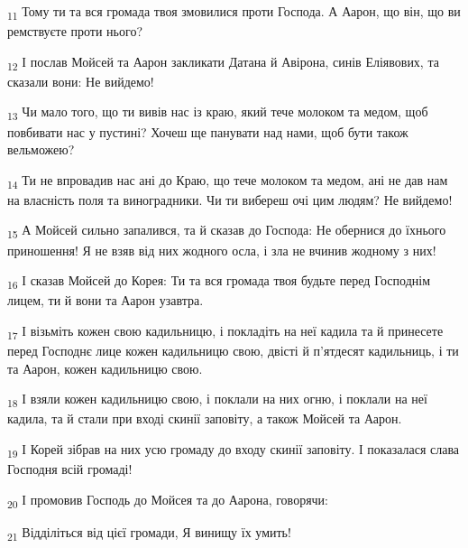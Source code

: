 \begin{tcolorbox}
\textsubscript{11} Тому ти та вся громада твоя змовилися проти Господа. А Аарон, що він, що ви ремствуєте проти нього?
\end{tcolorbox}
\begin{tcolorbox}
\textsubscript{12} І послав Мойсей та Аарон закликати Датана й Авірона, синів Еліявових, та сказали вони: Не вийдемо!
\end{tcolorbox}
\begin{tcolorbox}
\textsubscript{13} Чи мало того, що ти вивів нас із краю, який тече молоком та медом, щоб повбивати нас у пустині? Хочеш ще панувати над нами, щоб бути також вельможею?
\end{tcolorbox}
\begin{tcolorbox}
\textsubscript{14} Ти не впровадив нас ані до Краю, що тече молоком та медом, ані не дав нам на власність поля та виноградники. Чи ти вибереш очі цим людям? Не вийдемо!
\end{tcolorbox}
\begin{tcolorbox}
\textsubscript{15} А Мойсей сильно запалився, та й сказав до Господа: Не обернися до їхнього приношення! Я не взяв від них жодного осла, і зла не вчинив жодному з них!
\end{tcolorbox}
\begin{tcolorbox}
\textsubscript{16} І сказав Мойсей до Корея: Ти та вся громада твоя будьте перед Господнім лицем, ти й вони та Аарон узавтра.
\end{tcolorbox}
\begin{tcolorbox}
\textsubscript{17} І візьміть кожен свою кадильницю, і покладіть на неї кадила та й принесете перед Господнє лице кожен кадильницю свою, двісті й п'ятдесят кадильниць, і ти та Аарон, кожен кадильницю свою.
\end{tcolorbox}
\begin{tcolorbox}
\textsubscript{18} І взяли кожен кадильницю свою, і поклали на них огню, і поклали на неї кадила, та й стали при вході скинії заповіту, а також Мойсей та Аарон.
\end{tcolorbox}
\begin{tcolorbox}
\textsubscript{19} І Корей зібрав на них усю громаду до входу скинії заповіту. І показалася слава Господня всій громаді!
\end{tcolorbox}
\begin{tcolorbox}
\textsubscript{20} І промовив Господь до Мойсея та до Аарона, говорячи:
\end{tcolorbox}
\begin{tcolorbox}
\textsubscript{21} Відділіться від цієї громади, Я винищу їх умить!
\end{tcolorbox}
